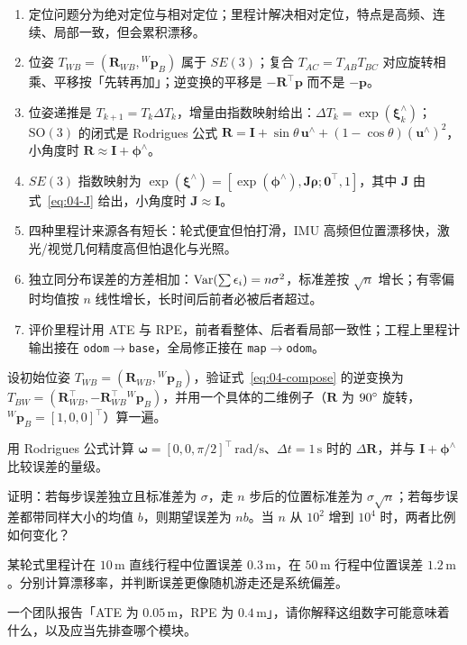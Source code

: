 \begin{summary}

\begin{enumerate}
  \item 定位问题分为绝对定位与相对定位；里程计解决相对定位，特点是高频、连续、局部一致，但会累积漂移。
  \item 位姿 $T_{WB}=(\bm{R}_{WB},{}^{W}\bm{p}_B)$ 属于 $SE(3)$；复合 $T_{AC}=T_{AB}T_{BC}$ 对应旋转相乘、平移按「先转再加」；逆变换的平移是 $-\bm{R}^{\top}\bm{p}$ 而不是 $-\bm{p}$。
  \item 位姿递推是 $T_{k+1}=T_{k}\Delta T_k$，增量由指数映射给出：$\Delta T_k=\exp(\bm{\xi}_k^{\wedge})$；$\mathrm{SO}(3)$ 的闭式是 Rodrigues 公式 $\bm{R}=\bm{I}+\sin\theta\,\bm{u}^{\wedge}+(1-\cos\theta)(\bm{u}^{\wedge})^{2}$，小角度时 $\bm{R}\approx\bm{I}+\bm{\phi}^{\wedge}$。
  \item $SE(3)$ 指数映射为 $\exp(\bm{\xi}^{\wedge})=[\exp(\bm{\phi}^{\wedge}),\bm{J}\bm{\rho};\bm{0}^{\top},1]$，其中 $\bm{J}$ 由式~\eqref{eq:04-J} 给出，小角度时 $\bm{J}\approx\bm{I}$。
  \item 四种里程计来源各有短长：轮式便宜但怕打滑，IMU 高频但位置漂移快，激光/视觉几何精度高但怕退化与光照。
  \item 独立同分布误差的方差相加：$\operatorname{Var}(\sum\epsilon_i)=n\sigma^{2}$，标准差按 $\sqrt{n}$ 增长；有零偏时均值按 $n$ 线性增长，长时间后前者必被后者超过。
  \item 评价里程计用 ATE 与 RPE，前者看整体、后者看局部一致性；工程上里程计输出接在 \texttt{odom}$\to$\texttt{base}，全局修正接在 \texttt{map}$\to$\texttt{odom}。
\end{enumerate}


\end{summary}

\begin{problemset}

  \item 设初始位姿 $T_{WB}=(\bm{R}_{WB},{}^{W}\bm{p}_B)$，验证式~\eqref{eq:04-compose} 的逆变换为 $T_{BW}=(\bm{R}_{WB}^{\top},-\bm{R}_{WB}^{\top}{}^{W}\bm{p}_B)$，并用一个具体的二维例子（$\bm{R}$ 为 $90^\circ$ 旋转，${}^{W}\bm{p}_B=[1,0,0]^{\top}$）算一遍。
  \item 用 Rodrigues 公式计算 $\bm{\omega}=[0,0,\pi/2]^{\top}\,\mathrm{rad/s}$、$\Delta t=1\,\mathrm{s}$ 时的 $\Delta\bm{R}$，并与 $\bm{I}+\bm{\phi}^{\wedge}$ 比较误差的量级。
  \item 证明：若每步误差独立且标准差为 $\sigma$，走 $n$ 步后的位置标准差为 $\sigma\sqrt{n}$；若每步误差都带同样大小的均值 $b$，则期望误差为 $nb$。当 $n$ 从 $10^{2}$ 增到 $10^{4}$ 时，两者比例如何变化？
  \item 某轮式里程计在 $10\,\mathrm{m}$ 直线行程中位置误差 $0.3\,\mathrm{m}$，在 $50\,\mathrm{m}$ 行程中位置误差 $1.2\,\mathrm{m}$。分别计算漂移率，并判断误差更像随机游走还是系统偏差。
  \item 一个团队报告「ATE 为 $0.05\,\mathrm{m}$，RPE 为 $0.4\,\mathrm{m}$」，请你解释这组数字可能意味着什么，以及应当先排查哪个模块。
\end{problemset}

